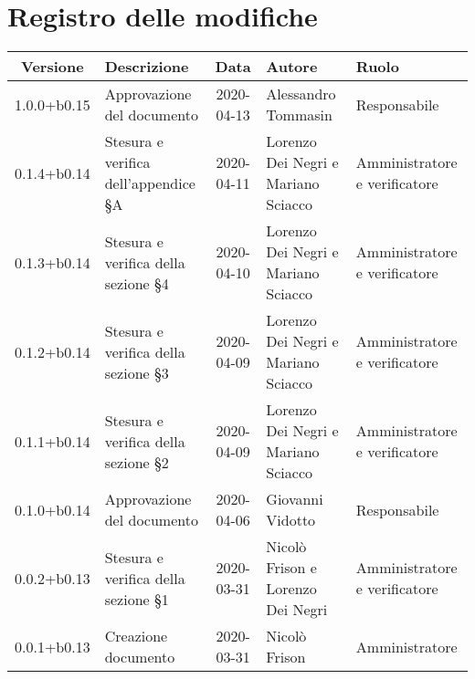 \section*{Registro delle modifiche}

\begin{center}
	\begin{longtable}{|c|p{3.5cm}|c|p{3cm}|p{3cm}|}
	\hline
	\rowcolor{lighter-grayer}
	\textbf{Versione} & \textbf{Descrizione} & \textbf{Data} & \textbf{Autore} & \textbf{Ruolo} \\
	\hline
	\endfirsthead
	
	
	1.0.0+b0.15 & Approvazione del documento & 2020-04-13 & Alessandro Tommasin & Responsabile \\
	\hline
	0.1.4+b0.14 & Stesura e verifica dell'appendice \S A & 2020-04-11 & Lorenzo Dei Negri e Mariano Sciacco & Amministratore e verificatore \\
	\hline
	0.1.3+b0.14 & Stesura e verifica della sezione \S4 & 2020-04-10 & Lorenzo Dei Negri e Mariano Sciacco & Amministratore e verificatore \\
	\hline
	0.1.2+b0.14 & Stesura e verifica della sezione \S3 & 2020-04-09 & Lorenzo Dei Negri e Mariano Sciacco & Amministratore e verificatore \\
	\hline
	0.1.1+b0.14 & Stesura e verifica della sezione \S2 & 2020-04-09 & Lorenzo Dei Negri e Mariano Sciacco & Amministratore e verificatore \\
	\hline
	0.1.0+b0.14 & Approvazione del documento & 2020-04-06 & Giovanni Vidotto & Responsabile \\
	\hline
	0.0.2+b0.13 & Stesura e verifica della sezione \S1 & 2020-03-31 & Nicolò Frison e Lorenzo Dei Negri & Amministratore e verificatore \\
	\hline
	0.0.1+b0.13 & Creazione documento & 2020-03-31 & Nicolò Frison & Amministratore \\
	\hline
	\end{longtable}
\end{center}